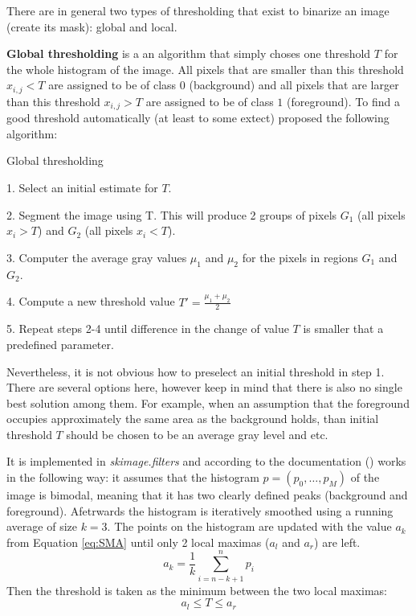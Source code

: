 
There are in general two types of thresholding that exist to binarize an image (create its mask): global and local.

\textbf{Global thresholding} is a an algorithm that simply choses one threshold $T$ for the whole histogram of the image. All pixels that are smaller than this threshold $x_{i,j} < T$ are assigned to be of class $0$ (background) and all pixels that are larger than this threshold $x_{i,j} > T$ are assigned to be of class $1$ (foreground). To find a good threshold automatically (at least to some extect) \cite{digital_image_book} proposed the following algorithm:

\begin{algorithm}[H]
  \caption{Global thresholding}
  \begin{algorithmic}
    \item 1. Select an initial estimate for $T$.
    \item 2. Segment the image using T. This will produce 2 groups of pixels $G_1$ (all pixels $x_i > T$) and $G_2$ (all pixels $x_i < T$).  
    \item 3. Computer the average gray values $\mu_1$ and $\mu_2$ for the pixels in  regions $G_1$ and $G_2$.
    \item 4. Compute a new threshold value 
        $T' = \frac{\mu_1 + \mu_2}{2}$
    \item 5. Repeat steps 2-4 until difference in the change of value $T$ is smaller that a predefined parameter.
  \end{algorithmic}
  \label{alg:global-thresholding}
\end{algorithm}

Nevertheless, it is not obvious how to preselect an initial threshold in step 1. There are several options here, however keep in mind that there is also no single best solution among them. For example, when an assumption that the foreground occupies approximately the same area as the background holds, than initial threshold $T$ should be chosen to be an average gray level and etc.

It is implemented in \textit{skimage.filters} and according to the documentation (\cite{global_thresh}) works in the following way: it assumes that the histogram $p = (p_0, \ldots, p_{M})$ of the image is bimodal, meaning that it has two clearly defined peaks (background and foreground). Afetrwards the histogram is iteratively smoothed using a running average of size $k=3$. The points on the histogram are updated with the value $a_k$ from Equation \ref{eq:SMA} until only 2 local maximas ($a_l$ and $a_r$) are left. 
\begin{equation}
    a_k = \frac{1}{k}\sum_{i=n-k + 1}^{n}p_i
\label{eq:SMA}
\end{equation}
Then the threshold is taken as the minimum between the two local maximas:
\begin{equation}
    a_l \leq T \leq a_r
\end{equation}

